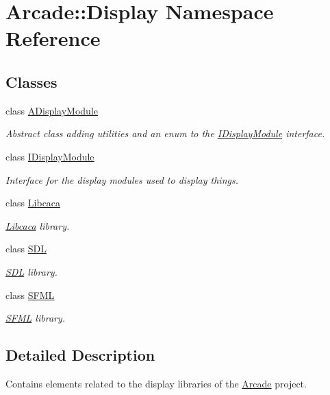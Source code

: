 \hypertarget{namespaceArcade_1_1Display}{}\section{Arcade\+::Display Namespace Reference}
\label{namespaceArcade_1_1Display}
\subsection*{Classes}
\begin{DoxyCompactItemize}
\item 
class \mbox{\hyperlink{classArcade_1_1Display_1_1ADisplayModule}{A\+Display\+Module}}
\begin{DoxyCompactList}\small\item\em Abstract class adding utilities and an enum to the \mbox{\hyperlink{classArcade_1_1Display_1_1IDisplayModule}{I\+Display\+Module}} interface. \end{DoxyCompactList}\item 
class \mbox{\hyperlink{classArcade_1_1Display_1_1IDisplayModule}{I\+Display\+Module}}
\begin{DoxyCompactList}\small\item\em Interface for the display modules used to display things. \end{DoxyCompactList}\item 
class \mbox{\hyperlink{classArcade_1_1Display_1_1Libcaca}{Libcaca}}
\begin{DoxyCompactList}\small\item\em \mbox{\hyperlink{classArcade_1_1Display_1_1Libcaca}{Libcaca}} library. \end{DoxyCompactList}\item 
class \mbox{\hyperlink{classArcade_1_1Display_1_1SDL}{S\+DL}}
\begin{DoxyCompactList}\small\item\em \mbox{\hyperlink{classArcade_1_1Display_1_1SDL}{S\+DL}} library. \end{DoxyCompactList}\item 
class \mbox{\hyperlink{classArcade_1_1Display_1_1SFML}{S\+F\+ML}}
\begin{DoxyCompactList}\small\item\em \mbox{\hyperlink{classArcade_1_1Display_1_1SFML}{S\+F\+ML}} library. \end{DoxyCompactList}\end{DoxyCompactItemize}


\subsection{Detailed Description}
Contains elements related to the display libraries of the \mbox{\hyperlink{namespaceArcade}{Arcade}} project. 